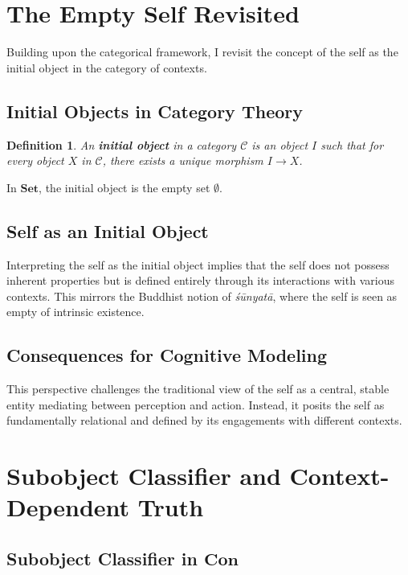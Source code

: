 \documentclass{article}
\newtheorem{definition}{Definition}[section]
\begin{document}
\section{The Empty Self Revisited}

Building upon the categorical framework, I revisit the concept of the self as the initial object in the category of contexts.

\subsection{Initial Objects in Category Theory}

\begin{definition}
An \textbf{initial object} in a category $\mathcal{C}$ is an object $I$ such that for every object $X$ in $\mathcal{C}$, there exists a unique morphism $I \to X$.
\end{definition}

In $\mathbf{Set}$, the initial object is the empty set $\emptyset$.

\subsection{Self as an Initial Object}

Interpreting the self as the initial object implies that the self does not possess inherent properties but is defined entirely through its interactions with various contexts. This mirrors the Buddhist notion of \emph{śūnyatā}, where the self is seen as empty of intrinsic existence.

\subsection{Consequences for Cognitive Modeling}

This perspective challenges the traditional view of the self as a central, stable entity mediating between perception and action. Instead, it posits the self as fundamentally relational and defined by its engagements with different contexts.

\section{Subobject Classifier and Context-Dependent Truth}

\subsection{Subobject Classifier in $\mathbf{Con}$}
\end{document}
